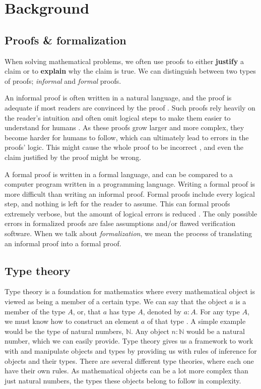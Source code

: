 \chapter{Background}
\label{ch:background}

\section{Proofs \& formalization}
\label{sec:proofs_formalization}

When solving mathematical problems, we often use proofs
to either \textbf{justify} a claim or to \textbf{explain} why the claim is true.
We can distinguish between two types of proofs; \emph{informal} and \emph{formal} proofs.

An informal proof is often written in a natural language, and the proof is adequate if most
readers are convinced by the proof \cite{bpierce}. Such proofs rely heavily on the reader's intuition
and often omit logical steps to make them easier to understand for humans \cite{ams:formal-proof}.
As these proofs grow larger and more complex, they become harder for humans to follow,
which can ultimately lead to errors in the proofs' logic. This might cause the whole proof
to be incorrect \cite{rkhamsi}, and even the claim justified by the proof might be wrong.

A formal proof is written in a formal language, and can be compared to a computer program
written in a programming language. Writing a formal proof is more difficult than writing an informal proof.
Formal proofs include every logical step, and nothing is left for the reader to assume.
This can formal proofs extremely verbose, but the amount of logical errors is reduced \cite{ams:formal-proof}.
The only possible errors in formalized proofs are false assumptions and/or flawed verification software.
When we talk about \emph{formalization}, we mean the process of translating an informal proof into a formal proof.

\section{Type theory}
\label{sec:type_theory}

Type theory is a foundation for mathematics \cite{typetheorystan}
where every mathematical object is viewed as being a member of a certain type.
We can say that the object $a$ is a member of the type $A$,
or, that $a$ has type $A$, denoted by $a : A$.
For any type $A$, we must know how to construct an element $a$ of that type \cite[p.~76]{lof1}.
A simple example would be the type of natural numbers, $\mathbb{N}$.
Any object $n : \mathbb{N}$ would be a natural number,
which we can easily provide.
Type theory gives us a framework to work with and manipulate objects and types
by providing us with rules of inference for objects and their types.
There are several different type theories, where each one have their own rules.
As mathematical objects can be a lot more complex than just natural numbers,
the types these objects belong to follow in complexity.

